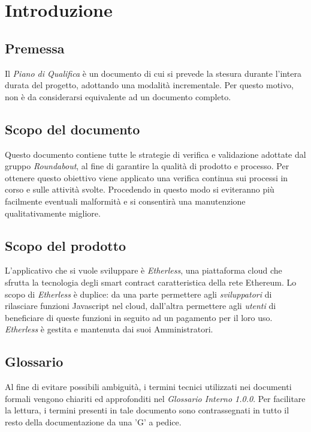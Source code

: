 \section{Introduzione}

\subsection{Premessa}
	Il \textit{Piano di Qualifica} è un documento di cui si prevede la stesura durante l'intera durata del progetto, adottando una modalità incrementale. Per questo motivo, non è da considerarsi equivalente ad un documento completo.


\subsection{Scopo del documento}
	Questo documento contiene tutte le strategie di verifica e validazione adottate dal gruppo \textit{Roundabout}, al fine di garantire la qualità di prodotto e processo. Per ottenere questo obiettivo viene applicato una verifica continua sui processi in corso e sulle attività svolte. Procedendo in questo modo si eviteranno più facilmente eventuali malformità e si consentirà una manutenzione qualitativamente migliore.


\subsection{Scopo del prodotto}
	L'applicativo che si vuole sviluppare è \textit{Etherless}, una piattaforma cloud che sfrutta la tecnologia
	degli smart contract caratteristica della rete Ethereum. Lo scopo di \textit{Etherless} è duplice: da una
	parte permettere agli \textit{sviluppatori} di rilasciare funzioni Javascript nel cloud, dall'altra
	permettere agli \textit{utenti} di beneficiare di queste funzioni in seguito ad un pagamento per il loro
	uso. \textit{Etherless} è gestita e mantenuta dai suoi Amministratori.


\subsection{Glossario}
	Al fine di evitare possibili ambiguità, i termini tecnici utilizzati nei documenti formali vengono
	chiariti ed approfonditi nel \textit{Glossario Interno 1.0.0}. Per facilitare la lettura, i termini presenti in
	tale documento sono contrassegnati in tutto il resto della documentazione da una 'G' a pedice.

